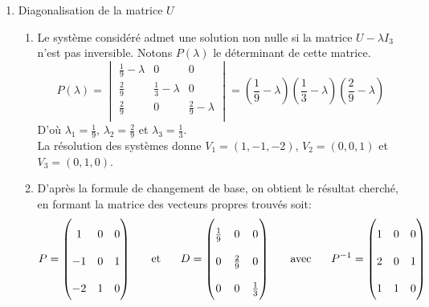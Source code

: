 \begin{enumerate}
\begin{enumerate}
\item  
\end{enumerate}
\item  Diagonalisation de la matrice $U$
\begin{enumerate}
\item Le système considéré admet une solution non nulle si la matrice $U-\lambda I_3$ n'est pas inversible. Notons $P(\lambda)$ le déterminant de cette matrice.
\begin{displaymath}
\renewcommand{\arraystretch}{1.6}
P(\lambda)=
\begin{vmatrix}
\frac19-\lambda&0&0\\
\frac 29&\frac 13-\lambda&0\\
\frac29&0&\frac29-\lambda\\
\end{vmatrix}=(\frac19-\lambda)(\frac 13-\lambda)(\frac29-\lambda)  
\end{displaymath}
D'où $\lambda_1=\frac 19$, $\lambda_2=\frac 29$ et $\lambda_3=\frac 13$.\\
La résolution des systèmes donne $V_1=(1,-1,-2)$, $V_2=(0,0,1)$ et $V_3=(0,1,0)$.
\item  D'après la formule de changement de base, on obtient le résultat cherché, en formant la matrice des vecteurs propres trouvés soit: 
\begin{displaymath} \renewcommand{\arraystretch}{2}
P = 
\begin{pmatrix}
1&0&0\\
-1&0& 1\\
-2&1&0      
\end{pmatrix}
\hspace{0.5cm}\text{ et }\hspace{0.5cm}
D = 
\begin{pmatrix}
\frac{1}{9} & 0 & 0 \\
0&\frac 29& 0\\
0&0&\frac 13  
\end{pmatrix}
\hspace{0.5cm}\text{ avec }\hspace{0.5cm}
P^{-1}=\begin{pmatrix}
1&0&0\\2&0& 1\\
1&1&0
\end{pmatrix}  
\end{displaymath}
\end{enumerate}


\end{enumerate}
